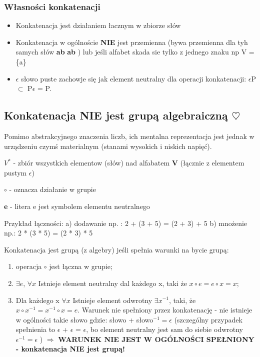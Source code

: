 \subsubsection{Własności konkatenacji}
\begin{itemize}
  \item Konkatenacja jest działaniem łacznym w zbiorze słów
  \item Konkatenacja w ogólnoście {\bf NIE} jest przemienna (bywa przemienna dla tyh samych słów {\bf ab} {\bf ab } ) lub jeśli alfabet skada sie tylko z jednego znaku np V = \{a\}
  \item $\epsilon$ słowo puste zachowje się jak element neutralny dla operacji konkatenacji: \newline $\epsilon$P $\subset$ 
  P$\epsilon$ = P.
\end{itemize}


\subsection{Konkatenacja NIE jest grupą algebraiczną  $\heartsuit$}
Pomimo abstrakcyjnego znaczenia liczb, ich mentalna reprezentacja jest jednak w urządzeniu czymś materialnym (stanami wysokich i niskich napięć).

 $V^{*}$ - zbiór wszystkich elementow (słów) nad alfabatem { \bf V} (łącznie z elementem pustym $\epsilon$)

$\circ$ - oznacza działanie w grupie 

{\bf e} - litera e jest symbolem elementu neutralnego \newline

Przykład łączności:
a) dodawanie np. : 2 + (3 + 5) = (2 + 3) + 5
b) mnożenie np.:  2 * (3 * 5) = (2 * 3) * 5
 
Konkatenacja jest grupą (z algebry) jeśli spełnia warunki na bycie grupą:


\begin{enumerate}[label=(\roman*)]
  \item operacja $\circ$ jest łączna w grupie;
  \item $\exists e$, $\forall x $ Istnieje element neutralny dal każdego x, taki że  $x \circ e = e \circ x = x$;
  \item Dla każdego x $\forall x $   Istnieje element odwrotny  $\exists x^{-1}$, taki, że  $x \circ  x^{-1} = x^{-1} \circ x = e$. \newline Warunek nie spełniony przez konkatenację - nie istnieje w ogólności takie słowo gdzie: słowo + słowo$^{-1} = \epsilon$ 
  (szczególny przypadek spełnienia to $\epsilon$ + $\epsilon$ = $\epsilon$, bo element neutralny jest sam do siebie odwrotny $\epsilon^{-1} = \epsilon$ ) \newline $\Rightarrow$ {\bf WARUNEK NIE JEST W OGÓLNOŚCI SPEŁNIONY - konkatenacja NIE jest grupą!}
\end{enumerate}


